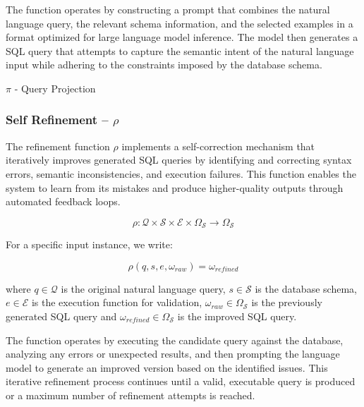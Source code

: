 The function operates by constructing a prompt that combines the natural language
query, the relevant schema information, and the selected examples in a format
optimized for large language model inference. The model then generates a SQL query
that attempts to capture the semantic intent of the natural language input while
adhering to the constraints imposed by the database schema.

\begin{algorithm}
\caption{$\pi$ - Query Projection}\label{algorithms:pi}
\begin{algorithmic}[1]
\end{algorithmic}
\end{algorithm}

\subsubsection{Self Refinement – $\rho$}\label{design:refinement-function}

The refinement function $\rho$ implements a self-correction mechanism that iteratively
improves generated SQL queries by identifying and correcting syntax errors,
semantic inconsistencies, and execution failures. This function enables the system
to learn from its mistakes and produce higher-quality outputs through automated
feedback loops.

$$
\rho: \mathcal{Q} \times \mathcal{S} \times \mathcal{E} \times \Omega_{\mathcal{S}} \rightarrow \Omega_{\mathcal{S}}
$$

\vspace{0.5em}

For a specific input instance, we write:

$$
\rho(q, s, e, \omega_{raw}) = \omega_{refined}
$$

\vspace{0.5em}

where $q \in \mathcal{Q}$ is the original natural language query, $s \in \mathcal{S}$
is the database schema, $e \in \mathcal{E}$ is the execution function for
validation, $\omega_{raw} \in \Omega_{\mathcal{S}}$ is the previously generated SQL
query and $\omega_{refined} \in \Omega_{\mathcal{S}}$ is the improved SQL query.

The function operates by executing the candidate query against the database, analyzing
any errors or unexpected results, and then prompting the language model to generate
an improved version based on the identified issues. This iterative refinement
process continues until a valid, executable query is produced or a maximum number
of refinement attempts is reached.

